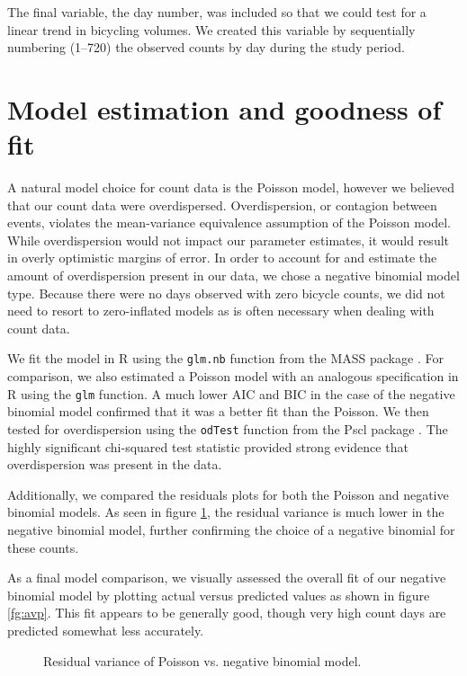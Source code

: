 \documentclass[12pt,letterpaper,article]{memoir}
\begin{document}
The final variable, the day number, was included so that we could test
for a linear trend in bicycling volumes. We created this variable by
sequentially numbering (1--720) the observed counts by day during the
study period.

\FloatBarrier
\section*{Model estimation and goodness of fit}
A natural model choice for count data is the Poisson model, however we
believed that our count data were overdispersed. Overdispersion, or
contagion between events, violates the mean-variance equivalence
assumption of the Poisson model. While overdispersion would not impact
our parameter estimates, it would result in overly optimistic margins
of error. In order to account for and estimate the amount of
overdispersion present in our data, we chose a negative binomial model
type. Because there were no days observed with zero bicycle counts, we
did not need to resort to zero-inflated models as is often necessary
when dealing with count data.

We fit the model in R using the \texttt{glm.nb} function from the MASS
package \parencite{Venables:2002aa}. For comparison, we also estimated
a Poisson model with an analogous specification in R using the
\texttt{glm} function. A much lower AIC and BIC in the case of the
negative binomial model confirmed that it was a better fit than the
Poisson. We then tested for overdispersion using the \texttt{odTest}
function from the Pscl package \parencite{Jackman:2014aa}. The highly
significant chi-squared test statistic provided strong evidence that
overdispersion was present in the data.

Additionally, we compared the residuals plots for both the Poisson and
negative binomial models. As seen in figure \ref{fg:respois}, the
residual variance is much lower in the negative binomial model,
further confirming the choice of a negative binomial for these counts.

As a final model comparison, we visually assessed the overall fit of
our negative binomial model by plotting actual versus predicted values
as shown in figure \ref{fg:avp}. This fit appears to be generally
good, though very high count days are predicted somewhat less
accurately.


\begin{figure}[ht!]
  \centering
  \hfill
  \caption{Residual variance of Poisson vs. negative binomial model.}
  \label{fg:respois}
\end{figure}
\end{document}
